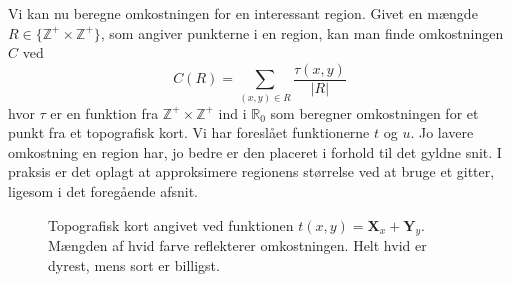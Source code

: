 {Vi kan nu beregne omkostningen for en interessant region. Givet en
mængde $R \in \{\mathbb{Z}^{+}\times\mathbb{Z}^{+}\}$, som angiver
punkterne i en region, kan man finde omkostningen $C$ ved
\begin{equation}
    C(R) = \sum_{(x, y) \in R}{\frac{\tau(x, y)}{|R|}}
\end{equation}
hvor $\tau$ er en funktion fra $\mathbb{Z}^{+}\times\mathbb{Z}^{+}$ ind
i $\mathbb{R}_0$ som beregner omkostningen for et punkt fra et
topografisk kort. Vi har foreslået funktionerne $t$ og $u$. Jo lavere
omkostning en region har, jo bedre er den placeret i forhold til det
gyldne snit. I praksis er det oplagt at approksimere regionens
størrelse ved at bruge et gitter, ligesom i det foregående afsnit.


\begin{figure}[h]
    \setlength\fboxsep{0pt}
    \setlength\fboxrule{0.5pt}
    \begin{center}
    \end{center}
    \caption[]{Topografisk kort angivet ved funktionen $t(x, y) =
    \mathbf{X}_x + \mathbf{Y}_y$. Mængden af hvid farve reflekterer
    omkostningen. Helt hvid er dyrest, mens sort er billigst.}
    \label{topography_plus}
\end{figure}

}
